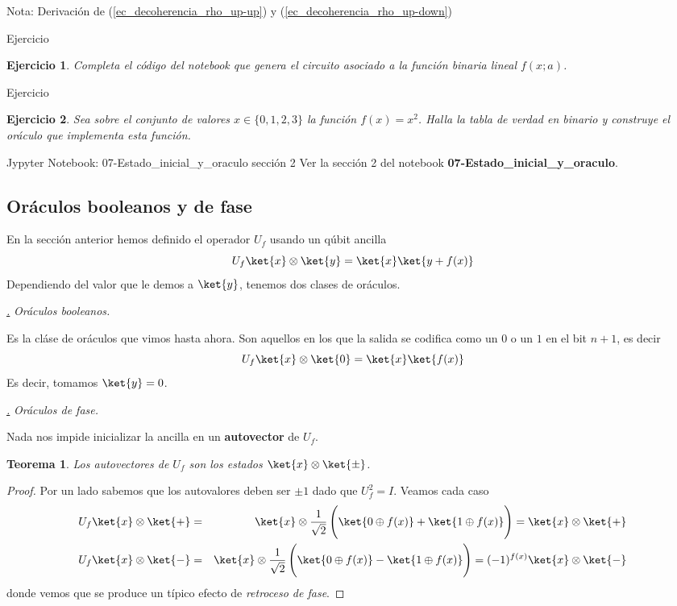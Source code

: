 \documentclass[a4paper,11pt]{book} %
\newtheorem{teorema_contador}{Teorema}
\newcommand{\Teorema}[1]{
		\begin{mybox_gray2}{}
			\begin{teorema_contador}
				 #1 
			\end{teorema_contador} 
		\end{mybox_gray2}
	}
\newtheorem{ejercicio_contador}{Ejercicio}
\newcommand{\Ejercicio}[1]{
		\begin{mybox_gray}{Ejercicio} 
			\begin{ejercicio_contador}
				 #1 
			\end{ejercicio_contador} 
		\end{mybox_gray}
	}
\numberwithin{equation}{chapter}
\def\subsubiContadorIt{\par\addtocounter{subsubsection}{1}\underline{\it\thesubsubsection.}\hskip0.5cm \setcounter{subsubsubsectionIt}{0}}
\newcommand{\SubsubiIt}[1]{
		\subsubiContadorIt \textit{#1}
	}
\newcounter{subsubsubsectionIt}[subsubsection]
\begin{document}
\begin{mybox_blue}{Nota: Derivación de (\ref{ec_decoherencia_rho_up-up}) y  (\ref{ec_decoherencia_rho_up-down})}
	\Ejercicio{Completa el código del notebook que genera el circuito asociado a la función binaria lineal $f(x;a)$.}
	
	\Ejercicio{Sea sobre el conjunto de valores $x\in \{0,1,2,3\}$ la función $f(x) = x^2$. Halla la tabla de verdad 
	en binario y construye el oráculo que implementa esta función.}



	\begin{mybox_orange}{Jypyter Notebook: 07-Estado\_inicial\_y\_oraculo sección 2}
	Ver la sección 2 del notebook \textbf{07-Estado\_inicial\_y\_oraculo}.
	\end{mybox_orange}
	
    	
    	
    	\subsection{Oráculos booleanos y de fase}

En la sección anterior hemos definido el operador  $U_f$ usando un qúbit ancilla
$$
U_f \ket{x}\otimes\ket{y} = \ket{x}\ket{y + f(x)}
$$
Dependiendo del valor que le demos a $\ket{y}$, tenemos dos clases de oráculos. 


			\SubsubiIt{Oráculos booleanos.}

Es la cláse de oráculos que vimos hasta ahora. Son aquellos en los que la salida se codifica como un $0$ o un $1$ en el bit $n+1$, es decir
$$
U_f \ket{x}\otimes\ket{0} = \ket{x}\ket{f(x)}
$$
Es decir, tomamos $\ket{y} = 0$.

			\SubsubiIt{Oráculos de fase.} 

Nada nos impide inicializar la ancilla en un \textbf{autovector} de $U_f$. 

	\Teorema{
	Los autovectores de $U_f$ son los estados $\ket{x}\otimes \ket{\pm}$.
	}
	
	\begin{proof}
	Por un lado sabemos que los autovalores deben ser $\pm 1$ dado que $U_f^2 = I$. Veamos cada caso
	\begin{eqnarray}
	U_f\ket{x}\otimes \ket{+} &=& \ket{x}\otimes \frac{1}{\sqrt{2}}\left( \rule{0mm}{6mm}\ket{0\oplus f(x)}+\ket{1\oplus f(x)} \right) 
	= 	\ket{x}\otimes \ket{+} \nonumber\\
	U_f\ket{x}\otimes \ket{-} &=& \ket{x}\otimes \frac{1}{\sqrt{2}}\left( \rule{0mm}{6mm} \ket{0\oplus f(x)}-\ket{1\oplus f(x)}\right) 
	= (-1)^{f(x)} \ket{x}\otimes \ket{-} \nonumber
	\end{eqnarray}
	donde vemos que se produce un típico efecto de \textit{retroceso de fase}.
	\end{proof}


\end{mybox_blue}
\end{document}
